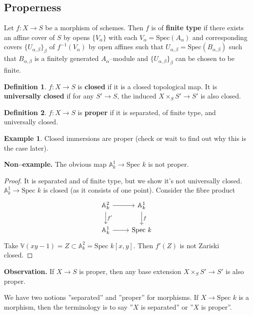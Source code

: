 \documentclass{article}
\theoremstyle{definition}
\newtheorem{example}{Example}[section]
\newtheorem{defn}{Definition}[section]
\begin{document}
\subsection{Properness}
Let $f:X \to S$ be a morphism of schemes. Then $f$ is of \textbf{finite type} if there exists an affine cover of $S$ by opens $\{V_{\alpha}\}$ with each $V_{\alpha} = \text{Spec}(A_\alpha)$ and corresponding covers $\{U_{\alpha,\beta}\}_{\beta}$ of $f^{-1}(V_{\alpha})$ by open affines such that $U_{\alpha,\beta} = \text{Spec}(B_{\alpha,\beta})$ such that $B_{\alpha,\beta}$ is a finitely generated $A_{\alpha}$--module and $\{U_{\alpha,\beta}\}_{\beta}$ can be chosen to be finite.

\begin{defn}
    $f:X \to S$ is \textbf{closed} if it is a closed topological map. It is \textbf{universally closed} if for any $S' \to S$, the induced $X \times_S S' \to S'$ is also closed.
\end{defn}
\begin{defn}
    $f: X \to S$ is \textbf{proper} if it is separated, of finite type, and universally closed.
\end{defn}
\begin{example}
    Closed immersions are proper (check or wait to find out why this is the case later).
\end{example}
\textbf{Non--example.} The obvious map $\mathbb{A}_k^1 \to \text{Spec }k$ is not proper.
\begin{proof}
    It is separated and of finite type, but we show it's not universally closed. $\mathbb{A}_k^1 \to \text{Spec }k$ is closed (as it consists of one point). Consider the fibre product $$\begin{tikzcd}[]
        \mathbb{A}_k^2 & \mathbb{A}_k^1\\
        \mathbb{A}_k^1 & \text{Spec }k
        \arrow["f", from=1-2, to=2-2]
        \arrow["f'",from=1-1, to=2-1]
        \arrow["", from=2-1, to=2-2]
        \arrow["", from=1-1, to=1-2]
    \end{tikzcd}$$
    Take $\mathbb{V}(xy-1) =Z \subset \mathbb{A}_k^2 = \text{Spec }k[x,y]$. Then $f'(Z)$ is not Zariski closed.
\end{proof}
\textbf{Observation.} If $X \to S$ is proper, then any base extension $X \times_S S' \to S'$ is also proper.

We have two notions ''separated'' and ''proper'' for morphisms. If $X \to \text{Spec }k$ is a morphism, then the terminology is to say ''$X$ is separated'' or ''$X$ is proper''.
\end{document}
